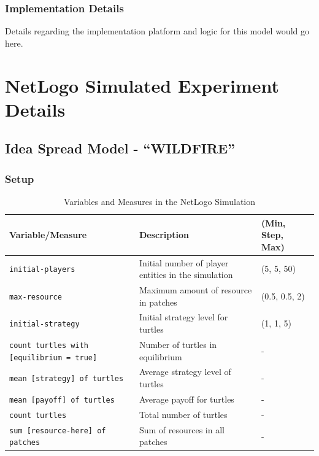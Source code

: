 \documentclass[sn-nature]{sn-jnl}%
\theoremstyle{thmstyleone}%
\theoremstyle{thmstyletwo}%
\theoremstyle{thmstylethree}%
\begin{document}
\subsubsection{Implementation Details}
Details regarding the implementation platform and logic for this model would go here.




\section{NetLogo Simulated Experiment Details}

\subsection{Idea Spread Model - \enquote{WILDFIRE}}
\subsubsection{Setup}
\begin{table}[h!]
\centering

\begin{tabular}{|l|l|l|}
\hline
\textbf{Variable/Measure} & \textbf{Description} & \textbf{(Min, Step, Max)} \\
\hline
\texttt{initial-players} & Initial number of player entities in the simulation & (5, 5, 50) \\
\hline
\texttt{max-resource} & Maximum amount of resource in patches & (0.5, 0.5, 2) \\
\hline
\texttt{initial-strategy} & Initial strategy level for turtles & (1, 1, 5) \\
\hline
\texttt{count turtles with [equilibrium = true]} & Number of turtles in equilibrium & - \\
\hline
\texttt{mean [strategy] of turtles} & Average strategy level of turtles & - \\
\hline
\texttt{mean [payoff] of turtles} & Average payoff for turtles & - \\
\hline
\texttt{count turtles} & Total number of turtles & - \\
\hline
\texttt{sum [resource-here] of patches} & Sum of resources in all patches & - \\
\hline
\end{tabular}
\caption{Variables and Measures in the NetLogo Simulation}
\label{tab:netlogo-vars-measures}
\end{table}
\end{document}
